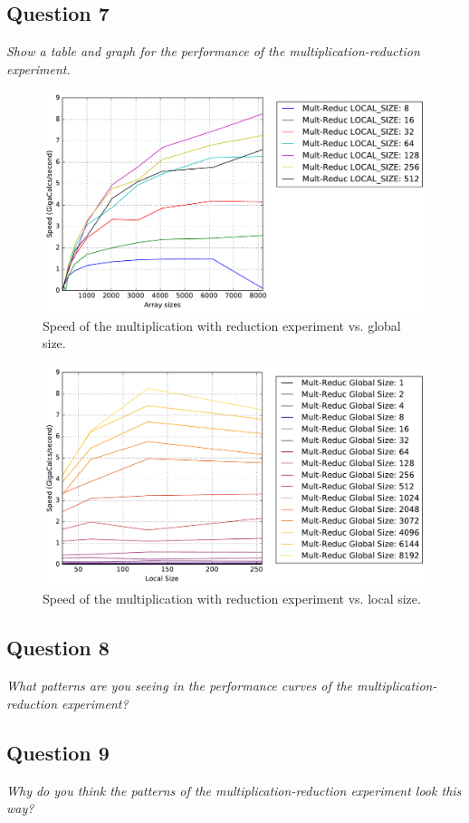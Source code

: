 \documentclass{article}
\begin{document}
\newpage
\subsection*{Question 7}
\textit{Show a table and graph for the performance of the multiplication-reduction experiment.}

\begin{figure}[h]
	\centering
        \includegraphics[width=0.7\linewidth]{Mult_Reduc_Arraysize.pdf}
        \caption{Speed of the multiplication with reduction experiment vs. global size.}
        \label{fig:ReducGlobal}
\end{figure}

\begin{figure}[h]
	\centering
        \includegraphics[width=0.7\linewidth]{Mult_Reduc_Localsize.pdf}
        \caption{Speed of the multiplication with reduction experiment vs. local size.}
        \label{fig:ReducLocal}
\end{figure}

\subsection*{Question 8}
\textit{What patterns are you seeing in the performance curves of the multiplication-reduction experiment?}



\subsection*{Question 9}
\textit{Why do you think the patterns of the multiplication-reduction experiment look this way?}
\end{document}
